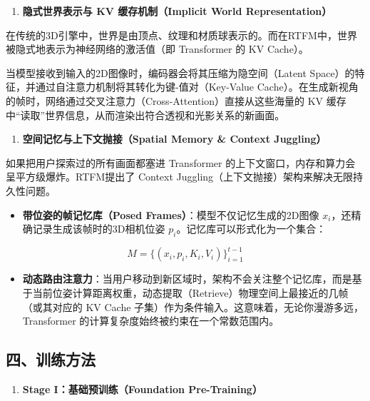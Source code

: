\begin{enumerate}
\def\labelenumi{\arabic{enumi}.}
\tightlist
\item
  \textbf{隐式世界表示与 KV 缓存机制（Implicit World Representation）}
\end{enumerate}

在传统的3D引擎中，世界是由顶点、纹理和材质球表示的。而在RTFM中，世界被隐式地表示为神经网络的激活值（即 Transformer 的 KV Cache）。

当模型接收到输入的2D图像时，编码器会将其压缩为隐空间（Latent Space）的特征，并通过自注意力机制将其转化为键-值对（Key-Value Cache）。在生成新视角的帧时，网络通过交叉注意力（Cross-Attention）直接从这些海量的 KV 缓存中``读取''世界信息，从而渲染出符合透视和光影关系的新画面。

\begin{enumerate}
\def\labelenumi{\arabic{enumi}.}
\setcounter{enumi}{1}
\tightlist
\item
  \textbf{空间记忆与上下文抛接（Spatial Memory \& Context Juggling）}
\end{enumerate}

如果把用户探索过的所有画面都塞进 Transformer 的上下文窗口，内存和算力会呈平方级爆炸。RTFM提出了 Context Juggling（上下文抛接）架构来解决无限持久性问题。

\begin{itemize}
\tightlist
\item
  \textbf{带位姿的帧记忆库（Posed Frames）}：模型不仅记忆生成的2D图像 \(x_i\)，还精确记录生成该帧时的3D相机位姿 \(p_i\)。记忆库可以形式化为一个集合：
\end{itemize}

\[
M = \{(x_i,p_i,K_i,V_i)\}_{i=1}^{t-1}
\]

\begin{itemize}
\tightlist
\item
  \textbf{动态路由注意力}：当用户移动到新区域时，架构不会关注整个记忆库，而是基于当前位姿计算距离权重，动态提取（Retrieve）物理空间上最接近的几帧（或其对应的 KV Cache 子集）作为条件输入。这意味着，无论你漫游多远，Transformer 的计算复杂度始终被约束在一个常数范围内。
\end{itemize}

\hypertarget{ux56dbux8badux7ec3ux65b9ux6cd5}{%
\subsection{四、训练方法}\label{ux56dbux8badux7ec3ux65b9ux6cd5}}

\begin{enumerate}
\def\labelenumi{\arabic{enumi}.}
\tightlist
\item
  \textbf{Stage I：基础预训练（Foundation Pre-Training）}
\end{enumerate}

